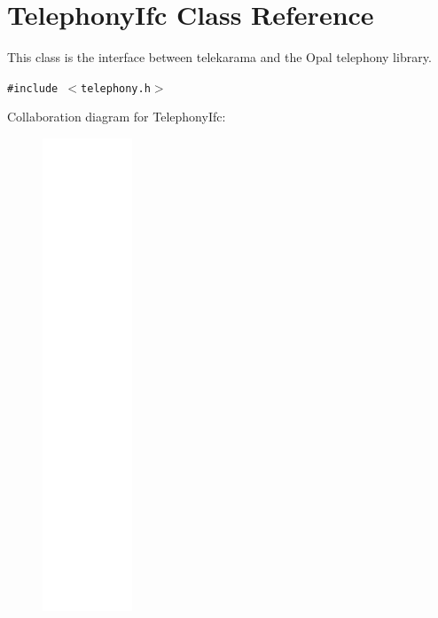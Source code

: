 \hypertarget{classTelephonyIfc}{
\section{TelephonyIfc Class Reference}
\label{classTelephonyIfc}
}
This class is the interface between telekarama and the Opal telephony library.  


{\tt \#include $<$telephony.h$>$}

Collaboration diagram for TelephonyIfc:\nopagebreak
\begin{figure}[H]
\begin{center}
\leavevmode
\includegraphics[height=400pt]{classTelephonyIfc__coll__graph}
\end{center}
\end{figure}
